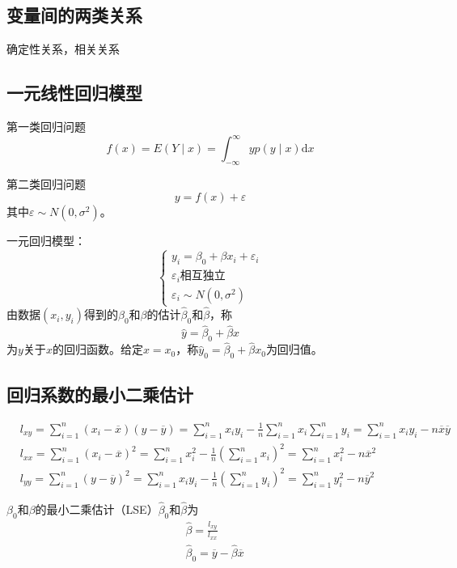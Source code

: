 \documentclass[lang = cn, scheme = chinese, thmcnt = section]{elegantbook}
\begin{document}
\subsection{变量间的两类关系}

确定性关系，相关关系

\subsection{一元线性回归模型}

第一类回归问题
$$
f(x)=E(Y\mid x)=\int_{-\infty}^{\infty}yp(y\mid x)\mathrm{d}x
$$

第二类回归问题
$$
y=f(x)+\varepsilon
$$
其中$\varepsilon\sim N(0,\sigma^2)$。

一元回归模型：
$$
\begin{cases}
	y_i=\beta_0+\beta x_i+\varepsilon_i\\
	\varepsilon_i\text{相互独立}\\
	\varepsilon_i\sim N(0,\sigma^2)
\end{cases}
$$
由数据$(x_i,y_i)$得到的$\beta_0$和$\beta$的估计$\hat{\beta}_0$和$\hat{\beta}$，称
$$
\hat{y}=\hat{\beta}_0+\hat{\beta}x
$$
为$y$关于$x$的回归函数。给定$x=x_0$，称$\hat{y}_0=\hat{\beta}_0+\hat{\beta}x_0$为回归值。

\subsection{回归系数的最小二乘估计}

\begin{align*}
	&l_{xy}=\sum_{i=1}^{n}(x_i-\overline{x})(y-\overline{y})=\sum_{i=1}^{n} x_iy_i-\frac{1}{n}\sum_{i=1}^{n} x_i\sum_{i=1}^{n} y_i=\sum_{i=1}^{n} x_iy_i-n\overline{x}\overline{y}\\
	&l_{xx}=\sum_{i=1}^{n}(x_i-\overline{x})^2=\sum_{i=1}^{n} x_i^2-\frac{1}{n}\left(\sum_{i=1}^{n} x_i\right)^2=\sum_{i=1}^{n} x_i^2-n\overline{x}^2\\
	&l_{yy}=\sum_{i=1}^{n}(y-\overline{y})^2=\sum_{i=1}^{n} x_iy_i-\frac{1}{n}\left(\sum_{i=1}^{n} y_i\right)^2=\sum_{i=1}^{n} y_i^2-n\overline{y}^2
\end{align*}

$\beta_0$和$\beta$的最小二乘估计（LSE）$\hat{\beta}_0$和$\hat{\beta}$为
\begin{align*}
	&\hat{\beta}=\frac{l_{xy}}{l_{xx}}\\
	& \hat{\beta}_0=\overline{y}-\hat{\beta}\overline{x}
\end{align*}
\end{document}
